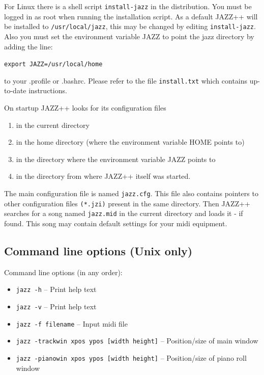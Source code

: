 \documentclass[letterpaper]{report}
\begin{document}
For Linux there is a shell script {\tt install-jazz} in the
distribution. You must be logged in as root when running the installation
script. As a default JAZZ++ will be installed to {\tt /usr/local/jazz},
this may be changed by editing {\tt install-jazz}. Also you
must set the environment variable JAZZ to point the jazz directory by
adding the line:

{\tt export JAZZ=/usr/local/home}

to your .profile or .bashrc. Please refer to the file
{\tt install.txt} which contains up-to-date instructions.

On startup JAZZ++ looks for its configuration files
\begin{enumerate}
\item in the current directory
\item in the home directory (where the environment variable HOME points to)
\item in the directory where the environment variable JAZZ points to
\item in the directory from where JAZZ++ itself was started.
\end{enumerate}
The main configuration file is named {\tt jazz.cfg}.
This file also contains pointers to other configuration files {\tt (*.jzi)}
present in the same directory.
Then JAZZ++ searches for a song named {\tt jazz.mid} in the current directory
and loads it - if found. This song may contain default settings for your
midi equipment.


\subsection{Command line options (Unix only)}

Command line options (in any order):

\begin{itemize}
\item {\tt jazz -h}                                   -- Print help text
\item {\tt jazz -v}                                   -- Print help text
\item {\tt jazz -f filename}                          -- Input midi file
\item {\tt jazz -trackwin xpos ypos [width height]}   -- Position/size of main window
\item {\tt jazz -pianowin xpos ypos [width height]}   -- Position/size of piano roll window
\end{itemize}
\end{document}
